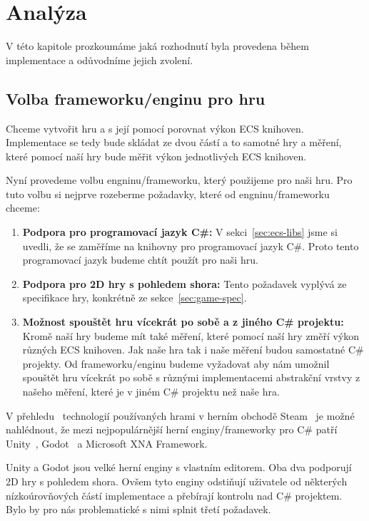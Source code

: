 \chapter{Analýza}
\label{chap:analysis}
V této kapitole prozkoumáme jaká rozhodnutí byla provedena během implementace a odůvodníme jejich zvolení.


\section{Volba frameworku/enginu pro hru}
Chceme vytvořit hru a s její pomocí porovnat výkon ECS knihoven. Implementace se tedy bude skládat ze dvou částí a to samotné hry a měření, které pomocí naší hry bude měřit výkon jednotlivých ECS knihoven.

Nyní provedeme volbu engninu/frameworku, který použijeme pro naši hru. Pro tuto volbu si nejprve rozeberme požadavky, které od engninu/frameworku chceme:

\begin{enumerate}
    \item \textbf{Podpora pro programovací jazyk C\#:} V sekci~\ref{sec:ecs-libs} jsme si uvedli, že se zaměříme na knihovny pro programovací jazyk C\#. Proto tento programovací jazyk budeme chtít použít pro naši hru.
    \item \textbf{Podpora pro 2D hry s pohledem shora:} Tento požadavek vyplývá ze specifikace hry, konkrétně ze sekce~\ref{sec:game-spec}.
    \item \textbf{Možnost spouštět hru vícekrát po sobě a z jiného C\# projektu:} Kromě naší hry budeme mít také měření, které pomocí naší hry změří výkon různých ECS knihoven. Jak naše hra tak i naše měření budou samostatné C\# projekty. Od frameworku/enginu budeme vyžadovat aby nám umožnil spouštět hru vícekrát po sobě s různými implementacemi abstrakční vrstvy z našeho měření, které je v jiném C\# projektu než naše hra.    
\end{enumerate}

V přehledu~\cite{SteamDB} technologií používaných hrami v herním obchodě Steam~\cite{Steam} je možné nahlédnout, že mezi nejpopulárnější herní enginy/frameworky pro C\# patří Unity~\cite{Unity}, Godot~\cite{Godot} a Microsoft XNA Framework.

Unity a Godot jsou velké herní enginy s vlastním editorem. Oba dva podporují 2D hry s pohledem shora. Ovšem tyto enginy odstiňují uživatele od některých nízkoúrovňových částí implementace a přebírají kontrolu nad C\# projektem. Bylo by pro nás problematické s nimi splnit třetí požadavek.

